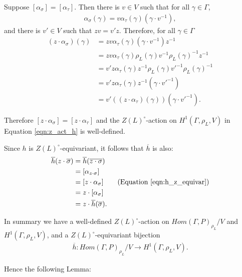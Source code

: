 Suppose $[\alpha_\sigma] = [\alpha_\tau]$. Then there is $v \in V$ such that for all $\gamma \in \Gamma$,
\begin{align*}
  \alpha_\sigma(\gamma) = v \alpha_\tau(\gamma) (\gamma \cdot v^{-1}),
\end{align*}
and there is $v' \in V$ such that $zv = v' z$. Therefore, for all $\gamma \in \Gamma$
\begin{align*}
	(z \cdot \alpha_\sigma)(\gamma) 
  &= z v \alpha_\tau(\gamma) (\gamma \cdot v^{-1}) z^{-1} \\
  &= z v \alpha_\tau(\gamma) \rho_L(\gamma) v^{-1} \rho_L(\gamma)^{-1} z^{-1} \\
  &= v' z \alpha_\tau(\gamma) z^{-1} \rho_L(\gamma) v'^{-1} \rho_L(\gamma)^{-1} \\
  &= v' z \alpha_\tau(\gamma) z^{-1} (\gamma \cdot v'^{-1}) \\
  &= v' ((z \cdot \alpha_\tau)(\gamma)) (\gamma \cdot v'^{-1}).
\end{align*}

Therefore $[z \cdot \alpha_\sigma] = [z \cdot \alpha_\tau]$ and the $Z(L)^\circ$-action on $H^1(\Gamma, \rho_L, V)$ in Equation \ref{eqn:z_act_h} is well-defined.

Since $h$ is $Z(L)^\circ$-equivariant, it follows that $\overline{h}$ is also:
\begin{align*}
  \overline{h}(z \cdot \overline{\sigma}) &= \overline{h}(\overline{z \cdot \sigma}) \\
  &= [\alpha_{z \cdot \sigma}] \\
  &= [z \cdot \alpha_\sigma] \qquad (\textrm{Equation }\ref{eqn:h_z_equivar}) \\
  &= z \cdot [\alpha_\sigma] \\
  &= z \cdot \overline{h}(\overline{\sigma}).
\end{align*}

In summary we have a well-defined $Z(L)^\circ$-action on $Hom(\Gamma, P)_{\rho_L}/V$ and $H^1(\Gamma, \rho_L, V)$, and a $Z(L)^\circ$-equivariant bijection 
\begin{align*}
  \overline{h}:Hom(\Gamma, P)_{\rho_L}/V \rightarrow H^1(\Gamma, \rho_L, V).
\end{align*}

Hence the following Lemma:

